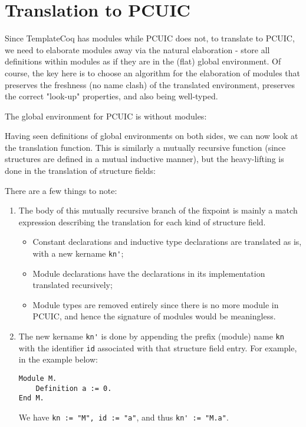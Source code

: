\section{Translation to PCUIC}

Since TemplateCoq has modules while PCUIC does not, to translate to PCUIC, we
need to elaborate modules away via the natural elaboration - store all
definitions within modules as if they are in the (flat) global environment. Of
course, the key here is to choose an algorithm for the elaboration of modules
that preserves the freshness (no name clash) of the translated environment,
preserves the correct "look-up" properties, and also being well-typed.

The global environment for PCUIC is without modules:


Having seen definitions of global environments on both sides, we can now look at
the translation function. This is similarly a mutually recursive function (since
structures are defined in a mutual inductive manner), but the heavy-lifting is
done in the translation of structure fields:


There are a few things to note:
\begin{enumerate}
  \item The body of this mutually recursive branch of the fixpoint is mainly a
  match expression describing the translation for each kind of structure field.
  \begin{itemize}
    \item Constant declarations and inductive type declarations are translated
    as is, with a new kername \verb|kn'|;
    \item Module declarations have the declarations in its implementation
    translated recursively;
    \item Module types are removed entirely since there is no more module in
    PCUIC, and hence the signature of modules would be meaningless.
  \end{itemize} 
  \item The new kername \verb|kn'| is done by appending the prefix (module) name
  \verb|kn| with the identifier \verb|id| associated with that structure field
  entry. For example, in the example below:
  \begin{verbatim}
Module M.
    Definition a := 0.
End M.
  \end{verbatim}
  We have \verb|kn := "M", id := "a"|, and thus \verb|kn' := "M.a"|.
\end{enumerate}


